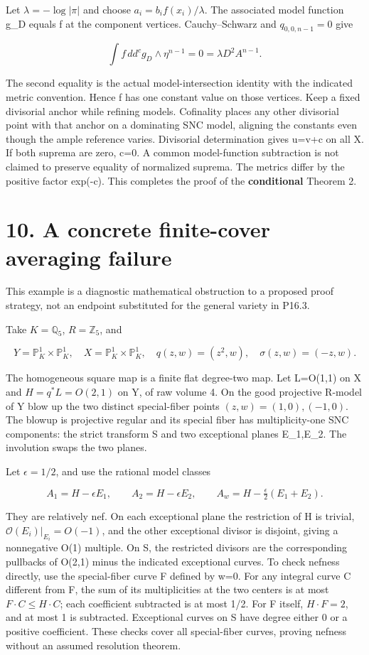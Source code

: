 \documentclass[11pt]{article}
\begin{document}
Let \(\lambda=-\log|\pi|\) and choose \(a_i=b_if(x_i)/\lambda\). The associated model function g\_D equals f at the component vertices. Cauchy--Schwarz and \(q_{0,0,n-1}=0\) give

\[
\int f\,dd^cg_D\wedge\eta^{n-1}=0
=\lambda D^2A^{n-1}.
\]

The second equality is the actual model-intersection identity with the indicated metric convention. Hence f has one constant value on those vertices. Keep a fixed divisorial anchor while refining models. Cofinality places any other divisorial point with that anchor on a dominating SNC model, aligning the constants even though the ample reference varies. Divisorial determination gives u=v+c on all X. If both suprema are zero, c=0. A common model-function subtraction is not claimed to preserve equality of normalized suprema. The metrics differ by the positive factor exp(-c). This completes the proof of the \textbf{conditional} Theorem 2.

\section*{10. A concrete finite-cover averaging failure}

This example is a diagnostic mathematical obstruction to a proposed proof strategy, not an endpoint substituted for the general variety in P16.3.

Take \(K=\mathbb Q_5\), \(R=\mathbb Z_5\), and

\[
Y=\mathbb P^1_K\times\mathbb P^1_K,
\quad X=\mathbb P^1_K\times\mathbb P^1_K,
\quad q(z,w)=(z^2,w),\quad\sigma(z,w)=(-z,w).
\]

The homogeneous square map is a finite flat degree-two map. Let L=O(1,1) on X and \(H=q^*L=O(2,1)\) on Y, of raw volume 4. On the good projective R-model of Y blow up the two distinct special-fiber points \((z,w)=(1,0),(-1,0)\). The blowup is projective regular and its special fiber has multiplicity-one SNC components: the strict transform S and two exceptional planes E\_1,E\_2. The involution swaps the two planes.

Let \(\epsilon=1/2\), and use the rational model classes

\[
A_1=H-\epsilon E_1,\qquad A_2=H-\epsilon E_2,
\qquad A_w=H-\tfrac\epsilon2(E_1+E_2).
\]

They are relatively nef. On each exceptional plane the restriction of H is trivial, \(\mathcal O(E_i)|_{E_i}=O(-1)\), and the other exceptional divisor is disjoint, giving a nonnegative O(1) multiple. On S, the restricted divisors are the corresponding pullbacks of O(2,1) minus the indicated exceptional curves. To check nefness directly, use the special-fiber curve F defined by w=0. For any integral curve C different from F, the sum of its multiplicities at the two centers is at most \(F\cdot C\leq H\cdot C\); each coefficient subtracted is at most 1/2. For F itself, \(H\cdot F=2\), and at most 1 is subtracted. Exceptional curves on S have degree either 0 or a positive coefficient. These checks cover all special-fiber curves, proving nefness without an assumed resolution theorem.
\end{document}
